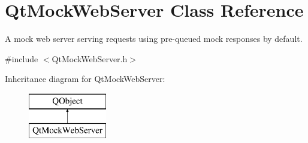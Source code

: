 \hypertarget{class_qt_mock_web_server}{\section{Qt\+Mock\+Web\+Server Class Reference}
\label{class_qt_mock_web_server}
}


A mock web server serving requests using pre-\/queued mock responses by default.  




{\ttfamily \#include $<$Qt\+Mock\+Web\+Server.\+h$>$}

Inheritance diagram for Qt\+Mock\+Web\+Server\+:\begin{figure}[H]
\begin{center}
\leavevmode
\includegraphics[height=2.000000cm]{class_qt_mock_web_server}
\end{center}
\end{figure}
